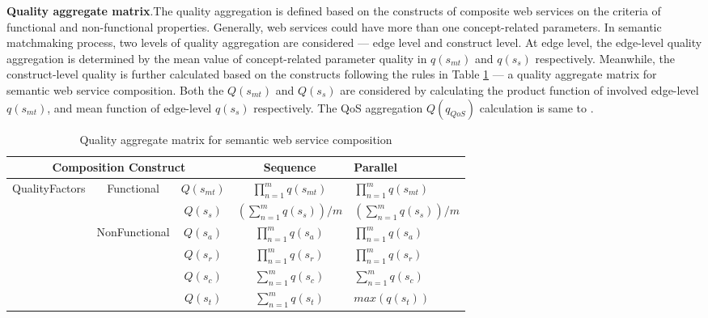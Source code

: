 \documentclass{llncs}
\begin{document}
\textbf{Quality aggregate matrix}.The quality aggregation is defined based on the constructs of composite web services on the criteria of functional and non-functional properties. Generally, web services could have more than one concept-related parameters. In semantic matchmaking process, two levels of quality aggregation are considered --- edge level and construct level. At edge level, the edge-level quality aggregation is determined by the mean value of concept-related parameter quality in $q(s_{mt})$ and $q(s_{s})$ respectively. Meanwhile, the construct-level quality is further calculated based on the constructs following the rules in Table \ref{table1} --- a quality aggregate matrix for semantic web service composition. Both the $Q(s_{mt})$ and $Q(s_{s})$ are considered by calculating the product function of involved edge-level $q(s_{mt})$, and mean function of edge-level $q(s_{s})$ respectively. The QoS aggregation $Q(q_{QoS})$ calculation is same to \cite{cardoso2004quality}.

\begin{table}[]
\centering
\caption{Quality aggregate matrix for semantic web service composition}
\label{table1}
\begin{tabular}{|c|c|c|c|l|}
\hline
\multicolumn{3}{|c|}{Composition Construct}                                      & Sequence                             & Parallel \\ \hline
\multirow{5}{*}{QualityFactors} & \multirow{2}{*}{Functional}    & $Q(s_ {mt})$  &$\prod_{n=1}^{m} q(s_ {mt})$          &  $\prod_{n=1}^{m} q(s_ {mt})$ \\ \cline{3-5}
                                &                                & $Q(s_ {s})$  & $(\sum_{n=1}^m q(s_ {s}))/m$        &  $(\sum_{n=1}^m q(s_ {s}))/m$  \\ \cline{2-5}   
                                & \multirow{4}{*}{NonFunctional} & $Q(s_{a})$    & $\prod_{n=1}^{m} q(s_a)$             &  $\prod_{n=1}^{m} q(s_a)$ \\ \cline{3-5} 
                                &                                & $Q(s_{r})$    & $\prod_{n=1}^{m} q(s_r)$             &  $\prod_{n=1}^{m} q(s_r)$ \\ \cline{3-5} 
                                &                                & $Q(s_{c})$    & $\sum_{n=1}^m q(s_ {c})$             &  $\sum_{n=1}^m q(s_ {c})$ \\ \cline{3-5} 
                                &                                & $Q(s_{t})$    & $\sum_{n=1}^m q(s_ {t})$             &  $max(q(s_ {t}))$ \\ \hline
\end{tabular}
\end{table}
\end{document}
